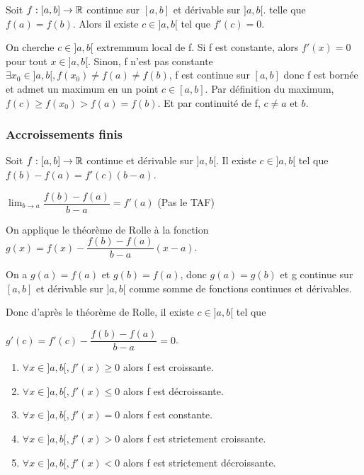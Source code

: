 \documentclass[a4paper, 12pt]{article}
\begin{document}
\begin{theorem}[de Kolle]
    Soit $f: [a, b] \rightarrow \mathbb{R}$ continue sur $[a, b]$ et dérivable sur $]a, b[$.
    telle que $f(a) = f(b)$. Alors il existe $c \in ]a, b[$ tel que $f'(c) = 0$.
\end{theorem}

\begin{demonstration}
    On cherche $c \in ]a, b[$ extremmum local de f.
    Si f est constante, alors $f'(x) = 0$ pour tout $x \in ]a, b[$.
    Sinon, f n'est pas constante $\exists x_0 \in ]a, b[, f(x_0) \neq f(a) \neq f(b)$, f est continue sur $[a, b]$ donc f est bornée et admet un maximum en un point $c \in [a, b]$.
    Par définition du maximum, $f(c) \geq f(x_0) \gt f(a) = f(b)$.
    Et par continuité de f, $c \neq a \text{ et } b$.
\end{demonstration}

\subsubsection{Accroissements finis}

\begin{theorem}
    Soit $f: [a, b] \rightarrow \mathbb{R}$ continue et dérivable sur $]a, b[$.
    Il existe $c \in ]a, b[$ tel que $f(b) - f(a) = f'(c)(b - a)$.
\end{theorem}

\begin{remark}
    $\lim_{b \to a} \dfrac{f(b) - f(a)}{b - a} = f'(a)$ (Pas le TAF)
\end{remark}

\begin{demonstration}
    On applique le théorème de Rolle à la fonction $g(x) = f(x) - \dfrac{f(b) - f(a)}{b - a}(x - a)$.

    On a $g(a) = f(a)$ et $g(b) = f(a)$, donc $g(a) = g(b)$ et g continue sur $[a, b]$ et dérivable sur $]a, b[$
    comme somme de fonctions continues et dérivables.

    Donc d'après le théorème de Rolle, il existe $c \in ]a, b[$ tel que \par $g'(c) = f'(c) - \dfrac{f(b) - f(a)}{b - a} = 0$.
\end{demonstration}

\begin{corollaire}
    \begin{enumerate}
        \item $\forall x \in ]a, b[, f'(x) \geq 0$ alors f est croissante.
        \item $\forall x \in ]a, b[, f'(x) \leq 0$ alors f est décroissante.
        \item $\forall x \in ]a, b[, f'(x) = 0$ alors f est constante.
        \item $\forall x \in ]a, b[, f'(x) \gt 0$ alors f est strictement croissante.
        \item $\forall x \in ]a, b[, f'(x) \lt 0$ alors f est strictement décroissante.
    \end{enumerate}
\end{corollaire}
\end{document}
